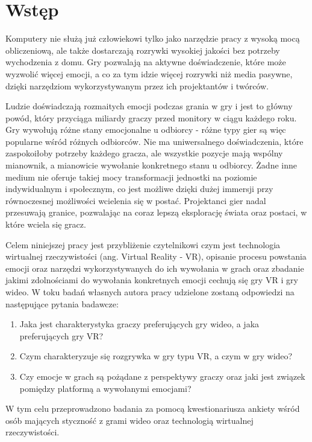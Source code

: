 \chapter*{Wstęp}
\label{chap:wstep}

Komputery nie służą już człowiekowi tylko jako narzędzie pracy z wysoką mocą obliczeniową, ale także dostarczają rozrywki wysokiej jakości bez potrzeby wychodzenia z domu. Gry pozwalają na aktywne doświadczenie, które może wyzwolić więcej emocji, a co za tym idzie więcej rozrywki niż media pasywne, dzięki narzędziom wykorzystywanym przez ich projektantów i twórców. 

Ludzie doświadczają rozmaitych emocji podczas grania w gry i jest to główny powód, który przyciąga miliardy graczy przed monitory w ciągu każdego roku. Gry wywołują różne stany emocjonalne u odbiorcy - różne typy gier są więc popularne wśród różnych odbiorców. Nie ma uniwersalnego doświadczenia, które zaspokoiłoby potrzeby każdego gracza, ale wszystkie pozycje mają wspólny mianownik, a mianowicie wywołanie konkretnego stanu u odbiorcy. Żadne inne medium nie oferuje takiej mocy transformacji jednostki na poziomie indywidualnym i społecznym, co jest możliwe dzięki dużej immersji przy równoczesnej możliwości wcielenia się w postać. Projektanci gier nadal przesuwają granice, pozwalając na coraz lepszą eksplorację świata oraz postaci, w które wciela się gracz.

Celem niniejszej pracy jest przybliżenie czytelnikowi czym jest technologia wirtualnej rzeczywistości (ang. Virtual Reality - VR), opisanie procesu powstania emocji oraz narzędzi wykorzystywanych do ich wywołania w grach oraz zbadanie jakimi zdolnościami do wywołania konkretnych emocji cechują się gry VR i gry wideo.  W toku badań własnych autora pracy udzielone zostaną odpowiedzi na następujące pytania badawcze: 

\begin{enumerate}
   \item Jaka jest charakterystyka graczy preferujących gry wideo, a jaka preferujących gry VR?
   \item Czym charakteryzuje się rozgrywka w gry typu VR, a czym w gry wideo?
   \item Czy emocje w grach są pożądane z perspektywy graczy oraz jaki jest związek pomiędzy platformą a wywołanymi emocjami?
\end{enumerate}

W tym celu przeprowadzono badania za pomocą kwestionariusza ankiety wśród osób mających styczność z grami wideo oraz technologią wirtualnej rzeczywistości.

